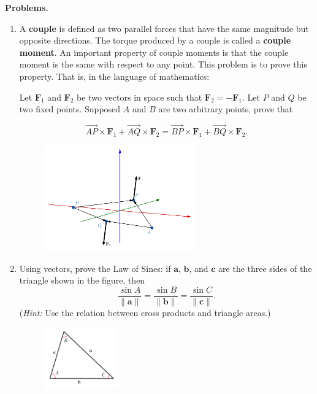 \documentclass[12pt]{article}
\title{}
\date{}
\newcommand{\norm}[1]{\lVert #1 \rVert}
\begin{document}
\noindent
{\bf Problems.}
\begin{enumerate}
\item

A {\bf couple} is defined as two parallel {forces} that have the same magnitude but opposite directions. The {torque} produced by a couple is called a {\bf couple moment}. An important property of couple moments is that the couple moment is the same with respect to any point. This problem is to prove this property. That is, in the language of mathematics:

Let $\mathbf F_1$ and $\mathbf F_2$ be two vectors in space such that $\mathbf F_2 = -\mathbf F_1$. Let $P$ and $Q$ be two fixed points. Supposed $A$ and $B$ are two arbitrary points, prove that

\[
\overrightarrow{AP}\times\mathbf F_1+\overrightarrow{AQ}\times\mathbf F_2 = \overrightarrow{BP}\times\mathbf F_1+\overrightarrow{BQ}\times\mathbf F_2.
\]

\begin{figure}[h]
\includegraphics[width=0.618\textwidth, right]{couplemoment.png}
\end{figure}
\clearpage
\item Using vectors, prove the Law of Sines: if $\mathbf a$, $\mathbf b$, and $\mathbf c$ are the three sides of the triangle shown in the figure, then
\[
\frac{\sin A}{\norm{\mathbf a}}=\frac{\sin B}{\norm{\mathbf b}}=\frac{\sin C}{\norm{\mathbf c}}.
\]
({\it Hint:} Use the relation between cross products and triangle areas.)
\begin{figure}[h]
\includegraphics[width=0.3\textwidth, right]{sinelaw.png}
\end{figure}
\end{enumerate}
\end{document}
